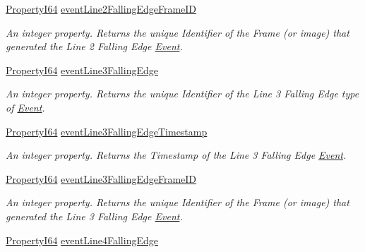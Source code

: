 \begin{DoxyCompactItemize}
\hyperlink{group___common_interface_ga81749b2696755513663492664a18a893}{Property\+I64} \hyperlink{classmv_i_m_p_a_c_t_1_1acquire_1_1_gen_i_cam_1_1_event_control_ad88e9f022bd27556b1edf452c8bf5655}{event\+Line2\+Falling\+Edge\+Frame\+I\+D}
\begin{DoxyCompactList}\small\item\em An integer property. Returns the unique Identifier of the Frame (or image) that generated the Line 2 Falling Edge \hyperlink{classmv_i_m_p_a_c_t_1_1acquire_1_1_event}{Event}. \end{DoxyCompactList}\item 
\hyperlink{group___common_interface_ga81749b2696755513663492664a18a893}{Property\+I64} \hyperlink{classmv_i_m_p_a_c_t_1_1acquire_1_1_gen_i_cam_1_1_event_control_af9395b2b3d1bb500ecbe2eb8a732a5e1}{event\+Line3\+Falling\+Edge}
\begin{DoxyCompactList}\small\item\em An integer property. Returns the unique Identifier of the Line 3 Falling Edge type of \hyperlink{classmv_i_m_p_a_c_t_1_1acquire_1_1_event}{Event}. \end{DoxyCompactList}\item 
\hyperlink{group___common_interface_ga81749b2696755513663492664a18a893}{Property\+I64} \hyperlink{classmv_i_m_p_a_c_t_1_1acquire_1_1_gen_i_cam_1_1_event_control_a892cc261ddcb2f6d568f066ebe76e024}{event\+Line3\+Falling\+Edge\+Timestamp}
\begin{DoxyCompactList}\small\item\em An integer property. Returns the Timestamp of the Line 3 Falling Edge \hyperlink{classmv_i_m_p_a_c_t_1_1acquire_1_1_event}{Event}. \end{DoxyCompactList}\item 
\hyperlink{group___common_interface_ga81749b2696755513663492664a18a893}{Property\+I64} \hyperlink{classmv_i_m_p_a_c_t_1_1acquire_1_1_gen_i_cam_1_1_event_control_a2b4ff20a9a766faaa3ccdbfc29eef6d0}{event\+Line3\+Falling\+Edge\+Frame\+I\+D}
\begin{DoxyCompactList}\small\item\em An integer property. Returns the unique Identifier of the Frame (or image) that generated the Line 3 Falling Edge \hyperlink{classmv_i_m_p_a_c_t_1_1acquire_1_1_event}{Event}. \end{DoxyCompactList}\item 
\hyperlink{group___common_interface_ga81749b2696755513663492664a18a893}{Property\+I64} \hyperlink{classmv_i_m_p_a_c_t_1_1acquire_1_1_gen_i_cam_1_1_event_control_a61e4eed8bf85b7023674d9935897dea1}{event\+Line4\+Falling\+Edge}

\end{DoxyCompactItemize}
